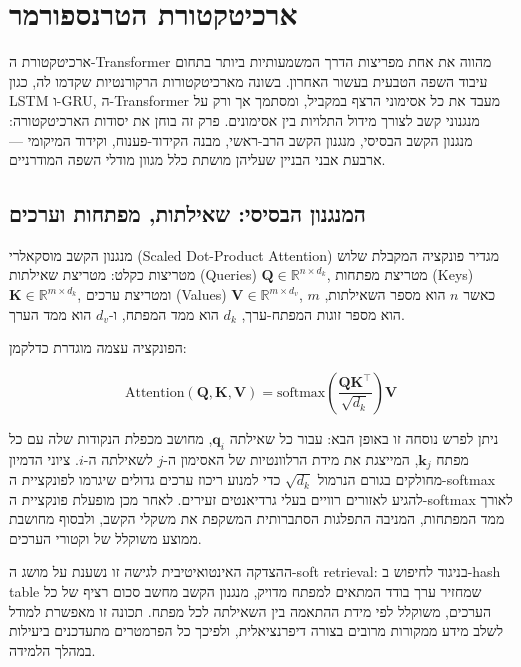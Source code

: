 \chapter{ארכיטקטורת הטרנספורמר}

ארכיטקטורת ה-\textenglish{Transformer} \cite{vaswani2017attention} מהווה את
אחת מפריצות הדרך המשמעותיות ביותר בתחום עיבוד השפה הטבעית בעשור האחרון.
בשונה מארכיטקטורות הרקורנטיות שקדמו לה, כגון \textenglish{LSTM} ו-\textenglish{GRU},
ה-\textenglish{Transformer} מעבד את כל אסימוני הרצף במקביל, ומסתמך
אך ורק על מנגנוני קשב לצורך מידול התלויות בין אסימונים.
פרק זה בוחן את יסודות הארכיטקטורה: מנגנון הקשב הבסיסי, מנגנון הקשב
הרב-ראשי, מבנה הקידוד-פענוח, וקידוד המיקומי — ארבעת אבני הבניין
שעליהן מושתת כלל מגוון מודלי השפה המודרניים.

\section{המנגנון הבסיסי: שאילתות, מפתחות וערכים}

מנגנון הקשב מוסקאלרי (\textenglish{Scaled Dot-Product Attention}) \cite{vaswani2017attention}
מגדיר פונקציה המקבלת שלוש מטריצות כקלט: מטריצת שאילתות
\textenglish{(Queries)} \(\mathbf{Q} \in \mathbb{R}^{n \times d_k}\),
מטריצת מפתחות \textenglish{(Keys)} \(\mathbf{K} \in \mathbb{R}^{m \times d_k}\),
ומטריצת ערכים \textenglish{(Values)} \(\mathbf{V} \in \mathbb{R}^{m \times d_v}\),
כאשר \(n\) הוא מספר השאילתות, \(m\) הוא מספר זוגות המפתח-ערך,
\(d_k\) הוא ממד המפתח, ו-\(d_v\) הוא ממד הערך.

הפונקציה עצמה מוגדרת כדלקמן:

\begin{equation}
  \text{Attention}(\mathbf{Q}, \mathbf{K}, \mathbf{V}) =
  \text{softmax}\!\left(\frac{\mathbf{Q}\mathbf{K}^{\top}}{\sqrt{d_k}}\right)\mathbf{V}
\end{equation}

ניתן לפרש נוסחה זו באופן הבא: עבור כל שאילתה \(\mathbf{q}_i\),
מחושב מכפלת הנקודות שלה עם כל מפתח \(\mathbf{k}_j\), המייצגת את
מידת הרלוונטיות של האסימון ה-\(j\) לשאילתה ה-\(i\).
ציוני הדמיון מחולקים בגורם הנרמול \(\sqrt{d_k}\) כדי למנוע
ריכוז ערכים גדולים שיגרמו לפונקציית ה-\textenglish{softmax}
להגיע לאזורים רוויים בעלי גרדיאנטים זעירים.
לאחר מכן מופעלת פונקציית ה-\textenglish{softmax} לאורך ממד המפתחות,
המניבה התפלגות הסתברותית המשקפת את משקלי הקשב,
ולבסוף מחושבת ממוצע משוקלל של וקטורי הערכים.

ההצדקה האינטואיטיבית לגישה זו נשענת על מושג ה-\textenglish{soft retrieval}:
בניגוד לחיפוש ב-\textenglish{hash table} שמחזיר ערך בודד המתאים למפתח מדויק,
מנגנון הקשב מחשב סכום רציף של כל הערכים, משוקלל לפי מידת ההתאמה
בין השאילתה לכל מפתח.
תכונה זו מאפשרת למודל לשלב מידע ממקורות מרובים בצורה דיפרנציאלית,
ולפיכך כל הפרמטרים מתעדכנים ביעילות במהלך הלמידה.

